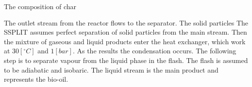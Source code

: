 \begin{table}[h!]
	\begin{subtable}[h]{0.49\textwidth}
		\centering		
		\caption{The composition of char}
		\label{tbl:Ash_Composition_Pyrolysis}
	\end{subtable}
	\caption{The composition of pyrolysis products}
\end{table}

The outlet stream from the reactor flows to the separator. The solid particles The SSPLIT assumes perfect separation of solid particles from the main stream. Then the mixture of gaseous and liquid products enter the heat exchanger, which work at $30 [^\circ C]$ and $1 [bar]$. As the results the condensation occurs. The following step is to separate vapour from the liquid phase in the flash. The flash is assumed to be adiabatic and isobaric. The liquid stream is the main product and represents the bio-oil. 

